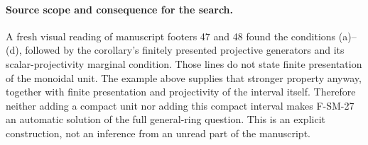 \paragraph{Source scope and consequence for the search.}
A fresh visual reading of manuscript footers 47 and 48 found the
conditions (a)--(d), followed by the corollary's finitely presented
projective generators and its scalar-projectivity marginal condition.
Those lines do not state finite presentation of the monoidal unit.
The example above supplies that stronger property anyway, together
with finite presentation and projectivity of the interval itself.
Therefore neither adding a compact unit nor adding this compact
interval makes F-SM-27 an automatic solution of the full general-ring
question.  This is an explicit construction, not an inference from
an unread part of the manuscript.

